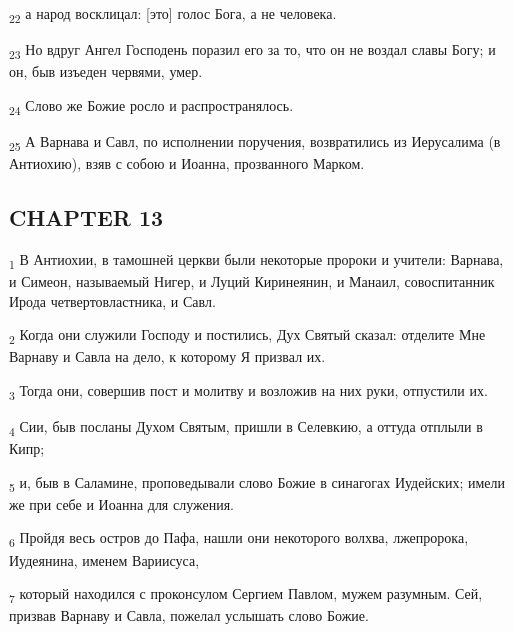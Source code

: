 \begin{tcolorbox}
\textsubscript{22} а народ восклицал: [это] голос Бога, а не человека.
\end{tcolorbox}
\begin{tcolorbox}
\textsubscript{23} Но вдруг Ангел Господень поразил его за то, что он не воздал славы Богу; и он, быв изъеден червями, умер.
\end{tcolorbox}
\begin{tcolorbox}
\textsubscript{24} Слово же Божие росло и распространялось.
\end{tcolorbox}
\begin{tcolorbox}
\textsubscript{25} А Варнава и Савл, по исполнении поручения, возвратились из Иерусалима (в Антиохию), взяв с собою и Иоанна, прозванного Марком.
\end{tcolorbox}
\subsection{CHAPTER 13}
\begin{tcolorbox}
\textsubscript{1} В Антиохии, в тамошней церкви были некоторые пророки и учители: Варнава, и Симеон, называемый Нигер, и Луций Киринеянин, и Манаил, совоспитанник Ирода четвертовластника, и Савл.
\end{tcolorbox}
\begin{tcolorbox}
\textsubscript{2} Когда они служили Господу и постились, Дух Святый сказал: отделите Мне Варнаву и Савла на дело, к которому Я призвал их.
\end{tcolorbox}
\begin{tcolorbox}
\textsubscript{3} Тогда они, совершив пост и молитву и возложив на них руки, отпустили их.
\end{tcolorbox}
\begin{tcolorbox}
\textsubscript{4} Сии, быв посланы Духом Святым, пришли в Селевкию, а оттуда отплыли в Кипр;
\end{tcolorbox}
\begin{tcolorbox}
\textsubscript{5} и, быв в Саламине, проповедывали слово Божие в синагогах Иудейских; имели же при себе и Иоанна для служения.
\end{tcolorbox}
\begin{tcolorbox}
\textsubscript{6} Пройдя весь остров до Пафа, нашли они некоторого волхва, лжепророка, Иудеянина, именем Вариисуса,
\end{tcolorbox}
\begin{tcolorbox}
\textsubscript{7} который находился с проконсулом Сергием Павлом, мужем разумным. Сей, призвав Варнаву и Савла, пожелал услышать слово Божие.
\end{tcolorbox}
